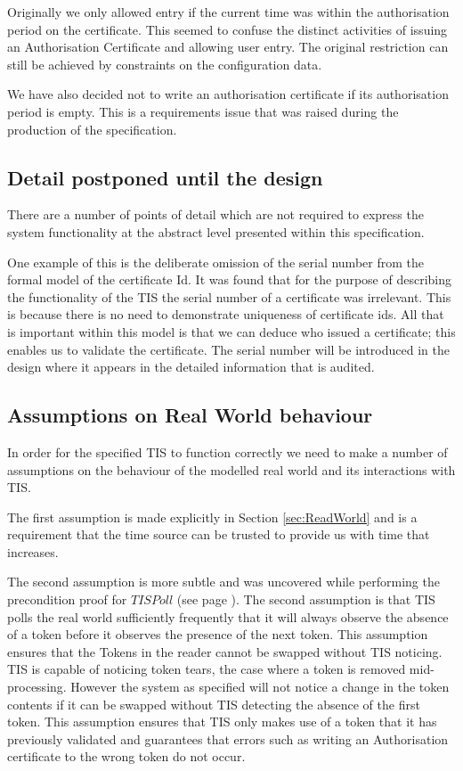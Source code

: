 Originally we only allowed entry if the current time was within the
authorisation period on the certificate. This seemed to confuse the
distinct activities of issuing an Authorisation Certificate and
allowing user entry. The original restriction can still be achieved by
constraints on the configuration data.

We have also decided not to write an authorisation certificate if its
authorisation period is empty. This is a requirements issue that was
raised during the production of the specification.

\subsection{Detail postponed until the design}

There are a number of points of detail which are not required to
express the system functionality at the abstract level presented
within this specification. 

One example of this is the deliberate omission of the serial number
from the formal model of the certificate Id. It was found that for the
purpose of describing the functionality of the TIS the serial number
of a certificate was irrelevant. This is because there is no need to
demonstrate uniqueness of certificate ids. All that is important
within this model is that we can deduce who issued a certificate; this
enables us to validate the certificate. The serial number will be
introduced in the design where it appears in the detailed information
that is audited. 

\subsection{Assumptions on Real World behaviour}
In order for the specified TIS to function correctly we need to make a
number of assumptions on the behaviour of the modelled real world and
its interactions with TIS.

The first assumption is made explicitly in Section
\ref{sec:ReadWorld} and is a requirement that the 
time source can be trusted to provide us with time that increases.

The second assumption is more subtle and was uncovered while
performing the precondition proof for $TISPoll$ (see page
\pageref{sec:PollPre}). The second assumption
is that TIS polls the real world sufficiently frequently that it will
always observe the absence of a token before it observes the presence
of the next token. This assumption ensures that the Tokens in the
reader cannot be swapped without TIS noticing. TIS is capable of
noticing token tears, the case where a token is removed mid-processing.
However the system as specified will not notice a change in the token
contents if it can be swapped without TIS detecting the absence of the
first token. This assumption ensures that TIS only makes use of a
token that it has previously validated and guarantees that errors such
as writing an Authorisation certificate to the wrong token do not occur.

